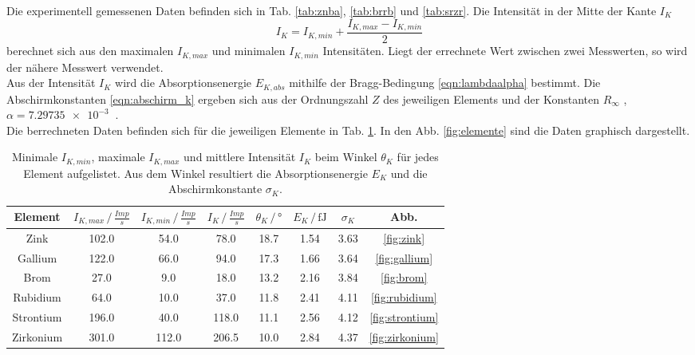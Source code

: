 Die experimentell gemessenen Daten befinden sich in Tab. \ref{tab:znba}, \ref{tab:brrb} und \ref{tab:srzr}.
Die Intensität in der Mitte der Kante $I_K$
\begin{equation*}
    I_K = I_{K,min} + \frac{I_{K,max} - I_{K,min}}{2}
\end{equation*}
berechnet sich aus den maximalen $I_{K,max}$ und minimalen $I_{K,min}$ Intensitäten.
Liegt der errechnete Wert zwischen zwei Messwerten, so wird der nähere Messwert verwendet.
\\
Aus der Intensität $I_K$ wird die Absorptionsenergie $E_{K,abs}$ mithilfe der Bragg-Bedingung \eqref{eqn:lambdaalpha} bestimmt.
Die Abschirmkonstanten \eqref{eqn:abschirm_k} ergeben sich aus der Ordnungszahl $Z$ des jeweiligen Elements und der Konstanten $R_\infty$ \cite{anleitung}, $\alpha = \SI{7.29735e-3}{}$ \cite{konst}.
\\
Die berrechneten Daten befinden sich für die jeweiligen Elemente in Tab. \ref{tab:erg_elemente}.
In den Abb. \ref{fig:elemente} sind die Daten graphisch dargestellt.
\begin{table}
    \centering
    \begin{tabular}{c|ccccccc}
    \toprule
    Element & $I_{K,max} \,/\, \si{\frac{Imp}{s}}$ & $I_{K,min} \,/\, \si{\frac{Imp}{s}}$ & $I_{K} \,/\, \si{\frac{Imp}{s}}$ & $\theta_K \,/\, \si{\degree}$ & $E_{K} \,/\, \si{\femto\joule}$ & $\sigma_K$ & Abb. \\
    \midrule
    Zink & 102.0 & 54.0 & 78.0 & 18.7 & 1.54 & 3.63 & \ref{fig:zink} \\
    Gallium & 122.0 & 66.0 & 94.0 & 17.3 & 1.66 & 3.64 & \ref{fig:gallium} \\
    Brom & 27.0 & 9.0 & 18.0 & 13.2 & 2.16 & 3.84 & \ref{fig:brom} \\
    Rubidium & 64.0 & 10.0 & 37.0 & 11.8 & 2.41 & 4.11 & \ref{fig:rubidium} \\
    Strontium & 196.0 & 40.0 & 118.0 & 11.1 & 2.56 & 4.12 & \ref{fig:strontium} \\
    Zirkonium & 301.0 & 112.0 & 206.5 & 10.0 & 2.84 & 4.37 & \ref{fig:zirkonium} \\
    \bottomrule
    \end{tabular}
    \caption{Minimale $I_{K,min}$, maximale $I_{K,max}$ und mittlere Intensität $I_K$ beim Winkel $\theta_K$ für jedes Element aufgelistet. Aus dem Winkel resultiert die Absorptionsenergie $E_K$ und die Abschirmkonstante $\sigma_K$.}
    \label{tab:erg_elemente}
\end{table}

